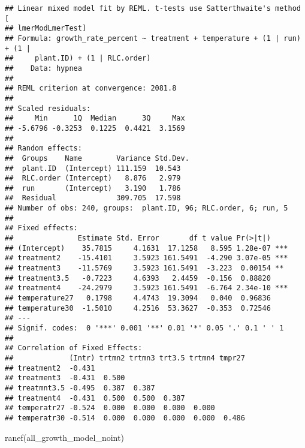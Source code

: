 \documentclass[
]{article}
\newenvironment{Shaded}{\begin{snugshade}}{\end{snugshade}}
\newcommand{\FunctionTok}[1]{\textcolor[rgb]{0.00,0.00,0.00}{#1}}
\newcommand{\NormalTok}[1]{#1}
\begin{document}
\begin{verbatim}
## Linear mixed model fit by REML. t-tests use Satterthwaite's method [
## lmerModLmerTest]
## Formula: growth_rate_percent ~ treatment + temperature + (1 | run) + (1 |  
##     plant.ID) + (1 | RLC.order)
##    Data: hypnea
## 
## REML criterion at convergence: 2081.8
## 
## Scaled residuals: 
##     Min      1Q  Median      3Q     Max 
## -5.6796 -0.3253  0.1225  0.4421  3.1569 
## 
## Random effects:
##  Groups    Name        Variance Std.Dev.
##  plant.ID  (Intercept) 111.159  10.543  
##  RLC.order (Intercept)   8.876   2.979  
##  run       (Intercept)   3.190   1.786  
##  Residual              309.705  17.598  
## Number of obs: 240, groups:  plant.ID, 96; RLC.order, 6; run, 5
## 
## Fixed effects:
##               Estimate Std. Error       df t value Pr(>|t|)    
## (Intercept)    35.7815     4.1631  17.1258   8.595 1.28e-07 ***
## treatment2    -15.4101     3.5923 161.5491  -4.290 3.07e-05 ***
## treatment3    -11.5769     3.5923 161.5491  -3.223  0.00154 ** 
## treatment3.5   -0.7223     4.6393   2.4459  -0.156  0.88820    
## treatment4    -24.2979     3.5923 161.5491  -6.764 2.34e-10 ***
## temperature27   0.1798     4.4743  19.3094   0.040  0.96836    
## temperature30  -1.5010     4.2516  53.3627  -0.353  0.72546    
## ---
## Signif. codes:  0 '***' 0.001 '**' 0.01 '*' 0.05 '.' 0.1 ' ' 1
## 
## Correlation of Fixed Effects:
##             (Intr) trtmn2 trtmn3 trt3.5 trtmn4 tmpr27
## treatment2  -0.431                                   
## treatment3  -0.431  0.500                            
## treatmnt3.5 -0.495  0.387  0.387                     
## treatment4  -0.431  0.500  0.500  0.387              
## temperatr27 -0.524  0.000  0.000  0.000  0.000       
## temperatr30 -0.514  0.000  0.000  0.000  0.000  0.486
\end{verbatim}

\begin{Shaded}
\begin{Highlighting}[]
\FunctionTok{ranef}\NormalTok{(all\_growth\_model\_noint)}
\end{Highlighting}
\end{Shaded}
\end{document}
